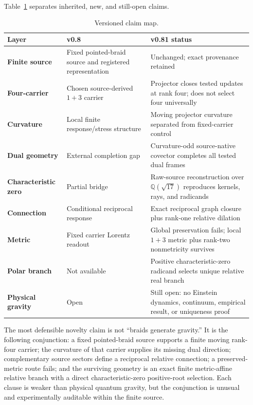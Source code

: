 \documentclass[12pt,a4paper,twoside]{article}
\newcommand{\Qsqrt}{\mathbb{Q}(\sqrt{17})}
\begin{document}
Table~\ref{tab:versions} separates inherited, new, and still-open claims.

\begin{table}[ht]
\centering
\caption{Versioned claim map.}
\label{tab:versions}
\small
\begin{tabularx}{\textwidth}{>{\bfseries}p{}XX}
\toprule
Layer & v0.8 & v0.81 status \\
\midrule
Finite source & Fixed pointed-braid source and registered representation & Unchanged; exact provenance retained \\
Four-carrier & Chosen source-derived $1+3$ carrier & Projector closes tested updates at rank four; does not select four universally \\
Curvature & Local finite response/stress structure & Moving projector curvature separated from fixed-carrier control \\
Dual geometry & External completion gap & Curvature-odd source-native covector completes all tested dual frames \\
Characteristic zero & Partial bridge & Raw-source reconstruction over $\Qsqrt$ reproduces kernels, rays, and radicands \\
Connection & Conditional reciprocal response & Exact reciprocal graph closure plus rank-one relative dilation \\
Metric & Fixed carrier Lorentz readout & Global preservation fails; local $1+3$ metric plus rank-two nonmetricity survives \\
Polar branch & Not available & Positive characteristic-zero radicand selects unique relative real branch \\
Physical gravity & Open & Still open: no Einstein dynamics, continuum, empirical result, or uniqueness proof \\
\bottomrule
\end{tabularx}
\end{table}

The most defensible novelty claim is not ``braids generate gravity.'' It is the following conjunction: a fixed pointed-braid source supports a finite moving rank-four carrier; the curvature of that carrier supplies its missing dual direction; complementary source sectors define a reciprocal relative connection; a preserved-metric route fails; and the surviving geometry is an exact finite metric-affine relative branch with a direct characteristic-zero positive-root selection. Each clause is weaker than physical quantum gravity, but the conjunction is unusual and experimentally auditable within the finite source.
\end{document}
